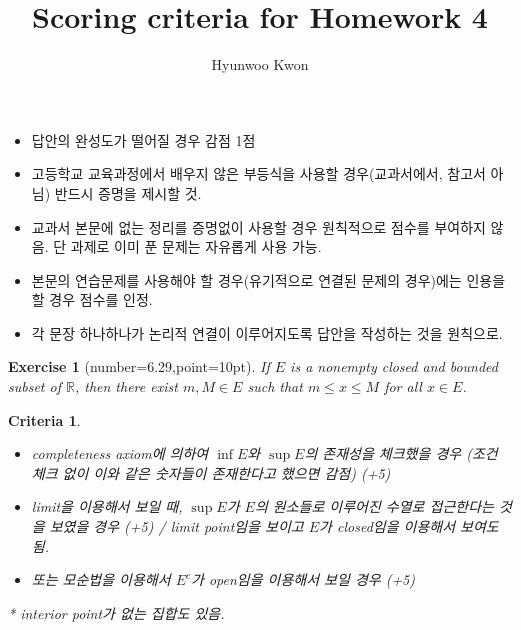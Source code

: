 \documentclass[oldfontcommands]{oblivoir}%
\title{Scoring criteria for Homework 4}
\author{Hyunwoo Kwon}
\newtheorem{exercise}{Exercise}[.exercise_box]
\newtheorem*{criteria}{Criteria}
\begin{document}
\maketitle 

\begin{itemize}
\item 답안의 완성도가 떨어질 경우 감점 1점
\item 고등학교 교육과정에서 배우지 않은 부등식을 사용할 경우(교과서에서, 참고서 아님) 반드시 증명을 제시할 것. 
\item 교과서 본문에 없는 정리를 증명없이 사용할 경우 원칙적으로 점수를 부여하지 않음. 단 과제로 이미 푼 문제는 자유롭게 사용 가능. 
\item 본문의 연습문제를 사용해야 할 경우(유기적으로 연결된 문제의 경우)에는 인용을 할 경우 점수를 인정. 
\item 각 문장 하나하나가 논리적 연결이 이루어지도록 답안을 작성하는 것을 원칙으로. 
\end{itemize}
 
 
 
 
 \begin{exercise}[number=6.29,point=10pt]\label{ex:closed and bounded-max and min}
 If  $E$ is  a nonempty closed and bounded subset of $\mathbb{R}$, then there exist $m , M \in E$ such that $m \le x \le M$ for all $x \in E$.
 \end{exercise} 
 \begin{criteria}\,
 \begin{itemize}
 \item  completeness axiom에 의하여 $\inf E$와 $\sup E$의 존재성을 체크했을 경우 (조건 체크 없이 이와 같은 숫자들이 존재한다고 했으면 감점) (+5)
 \item limit을 이용해서 보일 때, $\sup E$가 $E$의 원소들로 이루어진 수열로 접근한다는 것을 보였을 경우 (+5) / limit point임을 보이고 $E$가 closed임을 이용해서 보여도 됨. 
 \item 또는 모순법을 이용해서 $E^c$가 open임을 이용해서 보일 경우 (+5)
 \end{itemize}
 
 * interior point가 없는 집합도 있음.  
 \end{criteria}
  
  
 
\end{document}
